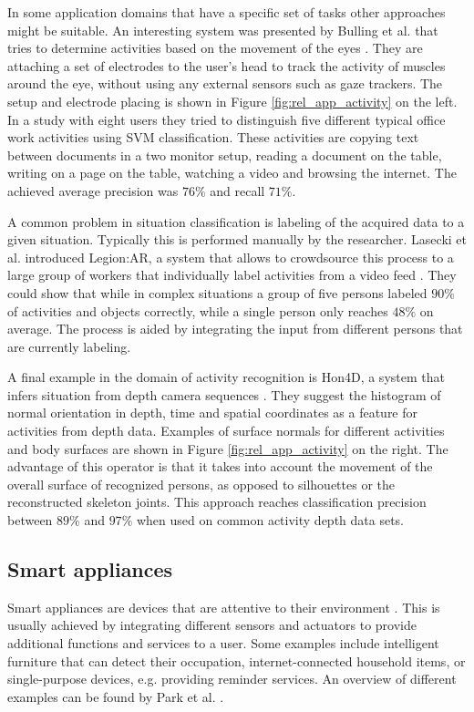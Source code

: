 In some application domains that have a specific set of tasks other approaches might be suitable. An interesting system was presented by Bulling et al. that tries to determine activities based on the movement of the eyes \cite{bulling2011eye}. They are attaching a set of electrodes to the user's head to track the activity of muscles around the eye, without using any external sensors such as gaze trackers. The setup and electrode placing is shown in Figure \ref{fig:rel_app_activity} on the left. In a study with eight users they tried to distinguish five different typical office work activities using SVM classification. These activities are copying text between documents in a two monitor setup, reading a document on the table, writing on a page on the table, watching a video and browsing the internet. The achieved average precision was $76\%$ and recall $71\%$.

A common problem in situation classification is labeling of the acquired data to a given situation. Typically this is performed manually by the researcher. Lasecki et al. introduced Legion:AR, a system that allows to crowdsource this process to a large group of workers that individually label activities from a video feed \cite{lasecki2013real}. They could show that while in complex situations a group of five persons labeled $90\%$ of activities and objects correctly, while a single person only reaches $48\%$ on average. The process is aided by integrating the input from different persons that are currently labeling.

A final example in the domain of activity recognition is Hon4D, a system that infers situation from depth camera sequences \cite{oreifej2013hon4d}. They suggest the histogram of normal orientation in depth, time and spatial coordinates as a feature for activities from depth data. Examples of surface normals for different activities and body surfaces are shown in Figure \ref{fig:rel_app_activity} on the right. The advantage of this operator is that it takes into account the movement of the overall surface of recognized persons, as opposed to silhouettes or the reconstructed skeleton joints. This approach reaches classification precision between $89\%$ and $97\%$ when used on common activity depth data sets. 

\subsection{Smart appliances}
Smart appliances are devices that are attentive to their environment \cite{schmidt2001build}. This is usually achieved by integrating different sensors and actuators to provide additional functions and services to a user. Some examples include intelligent furniture that can detect their occupation, internet-connected household items, or single-purpose devices, e.g. providing reminder services. An overview of different examples can be found by Park et al. \cite{park2003smart}. 

